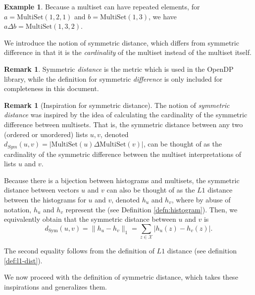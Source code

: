 \documentclass[11pt,a4paper]{article}
\theoremstyle{definition}
\newtheorem{remark}[theorem]{Remark}
\newtheorem{example}[theorem]{Example}
\newcommand{\MultiSet}{\mathrm{MultiSet}}
\newcommand{\todo}{{\textcolor{red}{TODO }}}
\begin{document}


\begin{example}
Because a multiset can have repeated elements, for $a = \MultiSet(1,2,1)$ and $b = \MultiSet(1,3)$, we have $a\Delta b = \MultiSet(1,3, 2)$. 
\end{example}

We introduce the notion of symmetric distance, which differs from symmetric difference in that it is the \emph{cardinality} of the multiset instead of the multiset itself.

\begin{remark}
    Symmetric \emph{distance} is the metric which is used in the OpenDP library, while the definition for symmetric \emph{difference} is only included for completeness in this document.
\end{remark}

\begin{remark}[Inspiration for symmetric distance]
    The notion of \emph{symmetric distance} was inspired by the idea of calculating the cardinality of the symmetric difference between multisets. That is, the symmetric distance between any two (ordered or unordered) lists $u, v$, denoted $d_{Sym}(u,v) = |\MultiSet(u) \Delta \MultiSet(v)|$, can be thought of as the cardinality of the symmetric difference between the multiset interpretations of lists $u$ and $v$. 
    
    Because there is a bijection between histograms and multisets, the symmetric distance between vectors $u$ and $v$ can also be thought of as the $L1$ distance between the histograms for $u$ and $v$, denoted $h_u$ and $h_v$, where by abuse of notation, $h_u$ and $h_v$ represent the  (see Definition \ref{defn:histogram}). Then, we equivalently obtain that the symmetric distance between $u$ and $v$ is
    $$d_{\text{Sym}}(u,v) = \lVert h_{u} - h_{v}\rVert_1 = \sum_{z\in \mathcal{X}} |h_u(z) - h_{v}(z)|.$$
    
    The second equality follows from the definition of $L1$ distance (see definition \ref{def:l1-dist}).
    
    We now proceed with the definition of symmetric distance, which takes these inspirations and generalizes them.
\end{remark}
\end{document}
